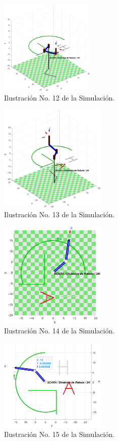 \documentclass[final]{foresj}
\begin{document}
\begin{figure}[h!]
\centering
\includegraphics[width=0.4\textwidth]{GHA2.png}
\caption{Ilustración No. 12 de la Simulación.}
\label{fig:my_label}
\end{figure}

\begin{figure}[h!]
\centering
\includegraphics[width=0.45\textwidth]{GHA3.png}
\caption{Ilustración No. 13 de la Simulación.}
\label{fig:my_label}
\end{figure}

\begin{figure}[h!]
\centering
\includegraphics[width=0.45\textwidth]{GHA4.png}
\caption{Ilustración No. 14 de la Simulación.}
\label{fig:my_label}
\end{figure}

\begin{figure}[h!]
\centering
\includegraphics[width=0.45\textwidth]{GHA5.png}
\caption{Ilustración No. 15 de la Simulación.}
\label{fig:my_label}
\end{figure}
\end{document}
